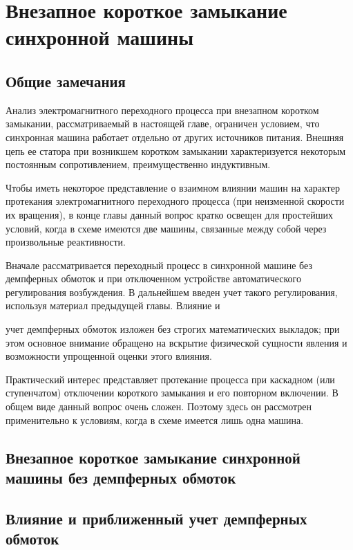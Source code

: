 \chapter{Внезапное короткое замыкание синхронной машины}
\label{chap:9}

\section{Общие замечания}
\label{sec:9-1}

Анализ электромагнитного переходного процесса при внезапном коротком замыкании, рассматриваемый в настоящей главе, ограничен условием, что синхронная машина работает отдельно от других источников питания. Внешняя цепь ее статора при возникшем коротком замыкании характеризуется некоторым постоянным сопротивлением, преимущественно индуктивным.

Чтобы иметь некоторое представление о взаимном влиянии машин на характер протекания электромагнитного переходного процесса (при неизменной скорости их вращения), в конце главы данный вопрос кратко освещен для простейших условий, когда в схеме имеются две машины, связанные между собой через произвольные реактивности.

Вначале рассматривается переходный процесс в синхронной машине без демпферных обмоток и при отключенном устройстве автоматического регулирования возбуждения. В дальнейшем введен учет такого регулирования, используя материал предыдущей главы. Влияние и

учет демпферных обмоток изложен без строгих математических выкладок; при этом основное внимание обращено на вскрытие физической сущности явления и возможности упрощенной оценки этого влияния.

Практический интерес представляет протекание процесса при каскадном (или ступенчатом) отключении короткого замыкания и его повторном включении. В общем виде данный вопрос очень сложен. Поэтому здесь он рассмотрен применительно к условиям, когда в схеме имеется лишь одна машина.

\section{Внезапное короткое замыкание синхронной машины без демпферных обмоток}
\label{sec:9-2}


\section{Влияние и приближенный учет демпферных обмоток}
\label{sec:9-3}

